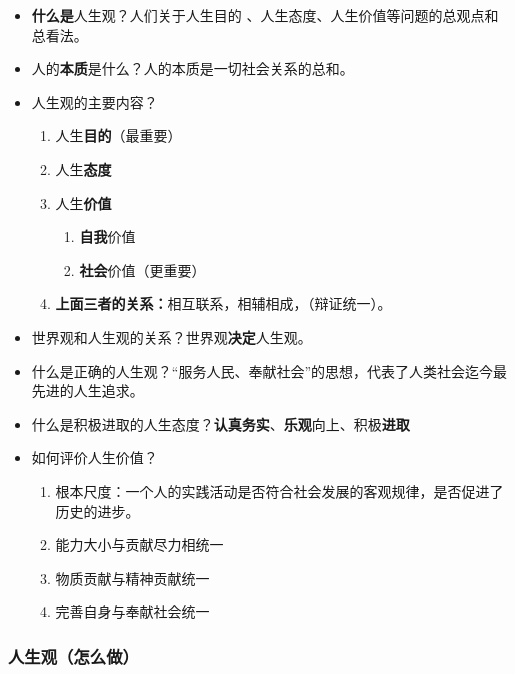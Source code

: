 \documentclass[
]{article}
\begin{document}
\begin{itemize}
\item
  \textbf{什么是}人生观？人们关于人生目的
  、人生态度、人生价值等问题的总观点和总看法。
\item
  人的\textbf{本质}是什么？人的本质是一切社会关系的总和。
\item
  人生观的主要内容？

  \begin{enumerate}
  \def\labelenumi{\arabic{enumi}.}
  \item
    人生\textbf{目的}（最重要）
  \item
    人生\textbf{态度}
  \item
    人生\textbf{价值}

    \begin{enumerate}
    \def\labelenumii{\arabic{enumii}.}
    \item
      \textbf{自我}价值
    \item
      \textbf{社会}价值（更重要）
    \end{enumerate}
  \item
    \textbf{上面三者的关系：}相互联系，相辅相成，（辩证统一）。
  \end{enumerate}
\item
  世界观和人生观的关系？世界观\textbf{决定}人生观。
\item
  什么是正确的人生观？``服务人民、奉献社会''的思想，代表了人类社会迄今最先进的人生追求。
\item
  什么是积极进取的人生态度？\textbf{认真务实}、\textbf{乐观}向上、积极\textbf{进取}
\item
  如何评价人生价值？

  \begin{enumerate}
  \def\labelenumi{\arabic{enumi}.}
  \item
    根本尺度：一个人的实践活动是否符合社会发展的客观规律，是否促进了历史的进步。
  \item
    能力大小与贡献尽力相统一
  \item
    物质贡献与精神贡献统一
  \item
    完善自身与奉献社会统一
  \end{enumerate}
\end{itemize}

\hypertarget{header-n51}{%
\subsubsection{人生观（怎么做）}\label{header-n51}}
\end{document}
